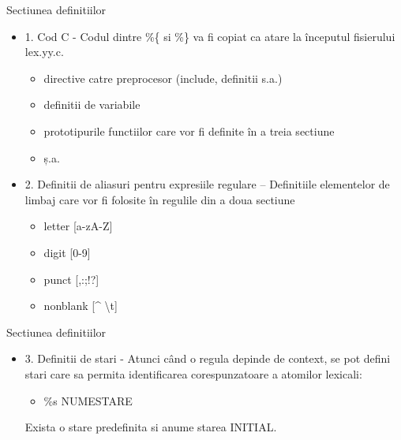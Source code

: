 \documentclass[pdf]{beamer}
\begin{document}
\begin{frame}{Sectiunea definitiilor}
\begin{itemize}
\item
1. Cod C - Codul dintre \%\{ si \%\} va fi copiat ca atare la începutul fisierului lex.yy.c. 

\begin{itemize}
\item
directive catre preprocesor (include, definitii s.a.)
\item
definitii de variabile
\item
prototipurile functiilor care vor fi definite în a treia sectiune
\item
ș.a.
\end{itemize}

\item
2. Definitii de aliasuri pentru expresiile regulare – Definitiile elementelor de limbaj care vor fi folosite în regulile din a doua sectiune

\begin{itemize}
\item
letter [a-zA-Z]
\item
digit [0-9]
\item
punct [,:;!?]
\item
nonblank [\^{}  \textbackslash t]
\end{itemize}

\end{itemize}
\end{frame}



\begin{frame}{Sectiunea definitiilor}
\begin{itemize}
\item
3. Definitii de stari - Atunci când o regula depinde de context, se pot defini stari care sa permita identificarea corespunzatoare a atomilor lexicali:

\begin{itemize}
    \item 
    \%s NUMESTARE
\end{itemize}

Exista o stare predefinita si anume starea INITIAL.

\end{itemize}
\end{frame}
\end{document}
